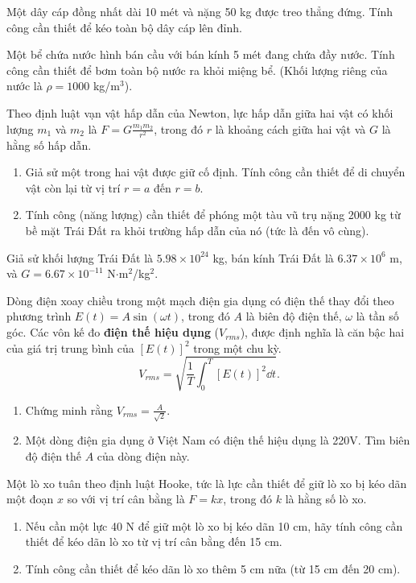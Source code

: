 \begin{exercise}
    Một dây cáp đồng nhất dài 10 mét và nặng 50 kg được treo thẳng đứng. Tính công cần thiết để kéo toàn bộ dây cáp lên đỉnh.
\end{exercise}

\begin{exercise}
    Một bể chứa nước hình bán cầu với bán kính 5 mét đang chứa đầy nước. Tính công cần thiết để bơm toàn bộ nước ra khỏi miệng bể. (Khối lượng riêng của nước là $\rho = 1000$ kg/m$^3$).
\end{exercise}

\begin{exercise}
    Theo định luật vạn vật hấp dẫn của Newton, lực hấp dẫn giữa hai vật có khối lượng $m_1$ và $m_2$ là $F = G \frac{m_1 m_2}{r^2}$, trong đó $r$ là khoảng cách giữa hai vật và $G$ là hằng số hấp dẫn.
    \begin{enumerate}[label=(\alph*)]
        \item Giả sử một trong hai vật được giữ cố định. Tính công cần thiết để di chuyển vật còn lại từ vị trí $r=a$ đến $r=b$.
        \item Tính công (năng lượng) cần thiết để phóng một tàu vũ trụ nặng 2000 kg từ bề mặt Trái Đất ra khỏi trường hấp dẫn của nó (tức là đến vô cùng).
    \end{enumerate}
    Giả sử khối lượng Trái Đất là $5.98 \times 10^{24}$ kg, bán kính Trái Đất là $6.37 \times 10^6$ m, và $G = 6.67 \times 10^{-11}$ N$\cdot$m$^2$/kg$^2$.
\end{exercise}

\begin{exercise}
    Dòng điện xoay chiều trong một mạch điện gia dụng có điện thế thay đổi theo phương trình $E(t) = A \sin(\omega t)$, trong đó $A$ là biên độ điện thế, $\omega$ là tần số góc. Các vôn kế đo \textbf{điện thế hiệu dụng} ($V_{rms}$), được định nghĩa là căn bậc hai của giá trị trung bình của $[E(t)]^2$ trong một chu kỳ.
    \[ V_{rms} = \sqrt{\frac{1}{T} \int_0^T [E(t)]^2 \dd t}. \]
    \begin{enumerate}[label=(\alph*)]
        \item Chứng minh rằng $V_{rms} = \frac{A}{\sqrt{2}}$.
        \item Một dòng điện gia dụng ở Việt Nam có điện thế hiệu dụng là 220V. Tìm biên độ điện thế $A$ của dòng điện này.
    \end{enumerate}
\end{exercise}

\begin{exercise}
    Một lò xo tuân theo định luật Hooke, tức là lực cần thiết để giữ lò xo bị kéo dãn một đoạn $x$ so với vị trí cân bằng là $F = kx$, trong đó $k$ là hằng số lò xo.
    \begin{enumerate}[label=(\alph*)]
        \item Nếu cần một lực 40 N để giữ một lò xo bị kéo dãn 10 cm, hãy tính công cần thiết để kéo dãn lò xo từ vị trí cân bằng đến 15 cm.
        \item Tính công cần thiết để kéo dãn lò xo thêm 5 cm nữa (từ 15 cm đến 20 cm).
    \end{enumerate}
\end{exercise}

